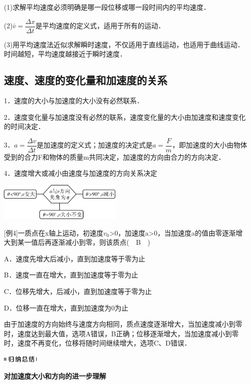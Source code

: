 \documentclass[cn,10.5pt,chinese,mac,chinesefont=founder]{elegantbook}
\begin{document}
(1)求解平均速度必须明确是哪一段位移或哪一段时间内的平均速度．

(2)$\bar v=\dfrac{\Delta x}{\Delta t}$是平均速度的定义式，适用于所有的运动．

(3)用平均速度法近似求解瞬时速度，不仅适用于直线运动，也适用于曲线运动．时间越短，平均速度越接近于瞬时速度．

\newpage
\subsection{速度、速度的变化量和加速度的关系}

1．速度的大小与加速度的大小没有必然联系．

2．速度变化量与加速度没有必然的联系，速度变化量的大小由加速度和速度变化的时间决定．

3．$a=\dfrac{\Delta v}{\Delta t}$是加速度的定义式；加速度的决定式是$a=\dfrac{F}{m}$，即加速度的大小由物体受到的合力F和物体的质量m共同决定，加速度的方向由合力的方向决定．

4．速度增大或减小由速度与加速度的方向关系决定

\begin{center}\includegraphics[width=2.38542in,height=0.72917in]{media/image15.png}\end{center}

{[}例4{]}一质点在x轴上运动，初速度$v_0$\textgreater0，加速度a\textgreater0，当加速度a的值由零逐渐增大到某一值后再逐渐减小到零，则该质点(　B　)

A．速度先增大后减小，直到加速度等于零为止

B．速度一直在增大，直到加速度等于零为止

C．位移先增大，后减小，直到加速度等于零为止

D．位移一直在增大，直到加速度为0为止

\begin{solution}
	由于加速度的方向始终与速度方向相同，质点速度逐渐增大，当加速度减小到零时，速度达到最大值，选项A错误，B正确；位移逐渐增大，当加速度减小到零时，速度不再变化，位移将随时间继续增大，选项C、D错误．
\end{solution}


\begin{center}\includegraphics[width=0.70833in,height=0.125in]{media/image13.png}

\textbf{对加速度大小和方向的进一步理解}
\end{center}
\end{document}
